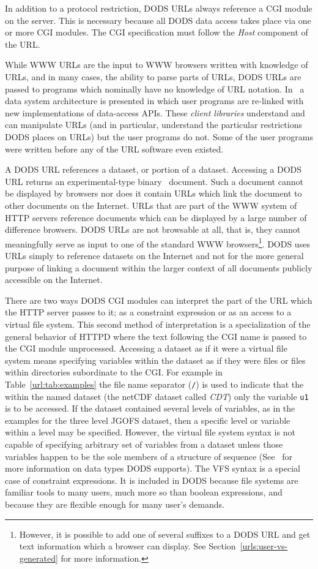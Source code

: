 In addition to a protocol restriction, DODS URLs always reference a
CGI module on the server. This is necessary because all DODS data
access takes place via one or more CGI modules. The CGI specification
must follow the {\em Host\/} component of the URL\@.

While WWW URLs are the input to WWW browsers written with knowledge of
URLs, and in many cases, the ability to parse parts of URLs, DODS URLs
are passed to programs which nominally have no knowledge of URL
notation. In \DDA\ a data system architecture is presented in which
user programs are re-linked with new implementations of data-access
APIs. These {\em client libraries\/} understand and can manipulate
URLs (and in particular, understand the particular restrictions DODS
places on URLs) but the user programs do not. Some of the user
programs were written before any of the URL software even existed.

A DODS URL references a dataset, or portion of a dataset. Accessing a DODS
URL returns an experimental-type binary \MIME\ document. Such a document
cannot be displayed by browsers nor does it contain URLs which link the
document to other documents on the Internet. URLs that are part of the WWW
system of HTTP servers reference documents which can be displayed by a large
number of difference browsers. DODS URLs are not browsable at all, that is,
they cannot meaningfully serve as input to one of the standard WWW
browsers\footnote{However, it is possible to add one of several suffixes to a
DODS URL and get text information which a browser can display. See
Section~\ref{urls:user-vs-generated} for more information.}. DODS uses URLs
simply to reference datasets on the Internet and not for the more general
purpose of linking a document within the larger context of all documents
publicly accessible on the Internet.

There are two ways DODS CGI modules can interpret the part of the URL
which the HTTP server passes to it; as a constraint expression or as
an access to a virtual file system. This second method of
interpretation is a specialization of the general behavior of HTTPD
where the text following the CGI name is passed to the CGI module
unprocessed. Accessing a dataset as if it were a virtual file system
means specifying variables within the dataset as if they were files
or files within directories subordinate to the CGI\@. For example in
Table~\ref{url:tab:examples} the file name separator ({\tt /}) is used
to indicate that the within the named dataset (the netCDF dataset
called {\em CDT\/}) only the variable {\tt u1} is to be accessed. If
the dataset contained several levels of variables, as in the examples
for the three level JGOFS dataset, then a specific level or variable
within a level may be specified.  However, the virtual file system
syntax is not capable of specifying arbitrary set of variables from a
dataset unless those variables happen to be the sole members of a
structure of sequence (See \DTP\ for more information on data types
DODS supports). The VFS syntax is a special case of constraint
expressions. It is included in DODS because file systems are familiar
tools to many users, much more so than boolean expressions, and
because they are flexible enough for many user's demands.


